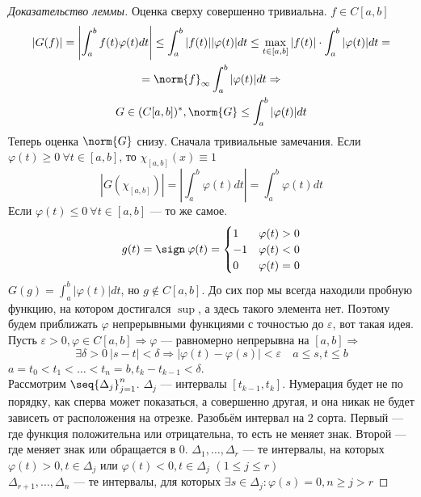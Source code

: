 \documentclass[document]{subfiles}
\begin{document}
\begin{proof}[Доказательство леммы]
    Оценка сверху совершенно тривиальна.
    $f \in C[a,b]$
    \begin{multline*}
        |G(f)| = \left| \int^b_a f(t) \varphi(t) dt \right| \leq \int^b_a |f(t)| |\varphi(t)| dt \leq \max_{t \in [a,b]} |f(t)| \cdot \int^b_a |\varphi(t)| dt = \\ =
        \norm{f}_\infty \int^b_a |\varphi(t)| dt \Rightarrow \\
        G \in (C[a,b])^*, \norm{G} \leq \int^b_a |\varphi(t)| dt
    \end{multline*}
    Теперь оценка $\norm{G}$ снизу. Сначала тривиальные замечания. Если $\varphi(t) \geq 0 \: \forall t \in [a,b]$, то $\chi_{[a,b]}(x) \equiv 1$
    \[ |G(\chi_{[a,b]})| = \left| \int^b_a \varphi(t) dt \right| = \int^b_a \varphi(t) dt \]
    Если $\varphi(t) \leq 0 \: \forall t \in [a,b]$ --- то же самое.
    \[ g(t) = \sign \: \varphi(t) = \begin{cases}
        1 & \varphi(t) > 0 \\
        -1 & \varphi(t) < 0 \\
        0 &\varphi(t) = 0
    \end{cases} \]
    $G(g) = \int^b_a |\varphi(t)| dt$, но $g \notin C[a,b]$.
    До сих пор мы всегда находили пробную функцию, на котором достигался $\sup$, а здесь такого элемента нет.
    Поэтому будем приближать $\varphi$ непрерывными функциями  с точностью до $\varepsilon$, вот такая идея. \\
    Пусть $\varepsilon > 0, \varphi \in C[a,b] \Rightarrow \varphi$ --- равномерно непрерывна на $[a,b] \Rightarrow$
    \[ \exists \delta > 0 \: |s-t| < \delta \Rightarrow |\varphi(t) - \varphi(s)| < \varepsilon \quad a \leq s, t \leq b \]
    $a = t_0 < t_1 < \ldots < t_n = b, t_k - t_{k-1} < \delta$. \\
    Рассмотрим $\seq{\Delta_j}^n_{j=1}$. $\Delta_j$ --- интервалы $[t_{k-1}, t_k]$.
    Нумерация будет не по порядку, как сперва может показаться, а совершенно другая, и она никак не будет зависеть от расположения на отрезке.
     Разобьём интервал на 2 сорта. Первый --- где функция положительна или отрицательна, то есть не меняет знак. Второй --- где меняет знак или обращается в 0.
    $\Delta_1, \ldots, \Delta_r$ --- те интервалы, на которых $\varphi(t) > 0, t \in \Delta_j$ или $\varphi(t) < 0, t \in \Delta_j$ $(1 \leq j \leq r)$ \\
    $\Delta_{r+1}, \ldots, \Delta_n$ --- те интервалы, для которых $\exists s \in \Delta_j : \varphi(s) = 0, n \geq j > r$

\end{proof}
\end{document}
